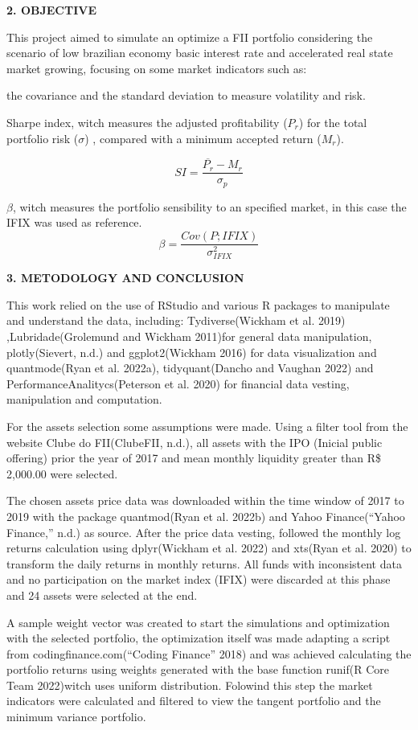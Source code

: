 \documentclass[
]{article}
\begin{document}
\begin{center}
\textbf{2. OBJECTIVE}
\end{center}

This project aimed to simulate an optimize a FII portfolio considering
the scenario of low brazilian economy basic interest rate and
accelerated real state market growing, focusing on some market
indicators such as:

the covariance and the standard deviation to measure volatility and
risk.

Sharpe index, witch measures the adjusted profitability (\(P_r\)) for
the total portfolio risk (\(\sigma\)) , compared with a minimum accepted
return (\(M_r\)).

\[ SI=\frac{\overline{P_r}-M_r}{\sigma_{p}} \]

\(\beta\), witch measures the portfolio sensibility to an specified
market, in this case the IFIX was used as
reference.\[\beta=\frac{Cov(P;IFIX)}{\sigma_{IFIX}^2}\]

\begin{center}
\textbf{3. METODOLOGY AND CONCLUSION}
\end{center}

This work relied on the use of RStudio and various R packages to
manipulate and understand the data, including: Tydiverse(Wickham et al.
2019) ,Lubridade(Grolemund and Wickham 2011)for general data
manipulation, plotly(Sievert, n.d.) and ggplot2(Wickham 2016) for data
visualization and quantmode(Ryan et al. 2022a), tidyquant(Dancho and
Vaughan 2022) and PerformanceAnalitycs(Peterson et al. 2020) for
financial data vesting, manipulation and computation.

For the assets selection some assumptions were made. Using a filter tool
from the website Clube do FII(ClubeFII, n.d.), all assets with the IPO
(Inicial public offering) prior the year of 2017 and mean monthly
liquidity greater than R\$ 2,000.00 were selected.

The chosen assets price data was downloaded within the time window of
2017 to 2019 with the package quantmod(Ryan et al. 2022b) and Yahoo
Finance({``Yahoo Finance,''} n.d.) as source. After the price data
vesting, followed the monthly log returns calculation using
dplyr(Wickham et al. 2022) and xts(Ryan et al. 2020) to transform the
daily returns in monthly returns. All funds with inconsistent data and
no participation on the market index (IFIX) were discarded at this phase
and 24 assets were selected at the end.

A sample weight vector was created to start the simulations and
optimization with the selected portfolio, the optimization itself was
made adapting a script from codingfinance.com({``Coding Finance''} 2018)
and was achieved calculating the portfolio returns using weights
generated with the base function runif(R Core Team 2022)witch uses
uniform distribution. Folowind this step the market indicators were
calculated and filtered to view the tangent portfolio and the minimum
variance portfolio.
\end{document}
